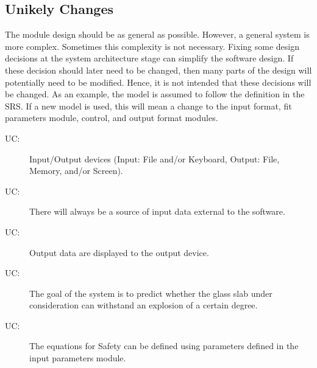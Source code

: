 \documentclass[12pt]{article}
\newcounter{ucnum}
\newcommand{\uctheucnum}{UC\theucnum}
\begin{document}
\subsection{Unikely Changes}
\label{Sec:UC}
The module design should be as general as possible. However, a general system is more complex. Sometimes this complexity is not necessary. Fixing some design decisions at the system architecture stage can simplify the software design. If these decision should later need to be changed, then many parts of the design will potentially need to be modified. Hence, it is not intended that these decisions will be changed.  As an example, the model is assumed to follow the definition in the SRS.  If a new model is used, this will mean a change to the input format, fit parameters module, control, and output format modules.
\begin{description}
\item[\uctheucnum\label{UCIO}:]Input/Output devices (Input: File and/or Keyboard, Output: File, Memory, and/or Screen).
\end{description}
\begin{description}
\item[\uctheucnum\label{UCinputsource}:]There will always be a source of input data external to the software.
\end{description}
\begin{description}
\item[\uctheucnum\label{UCoutput}:]Output data are displayed to the output device.
\end{description}
\begin{description}
\item[\uctheucnum\label{UCgoal}:]The goal of the system is to predict whether the glass slab under consideration can withstand an explosion of a certain degree.
\end{description}
\begin{description}
\item[\uctheucnum\label{UCequations}:]The equations for Safety can be defined using parameters defined in the input parameters module.
\end{description}
\end{document}
